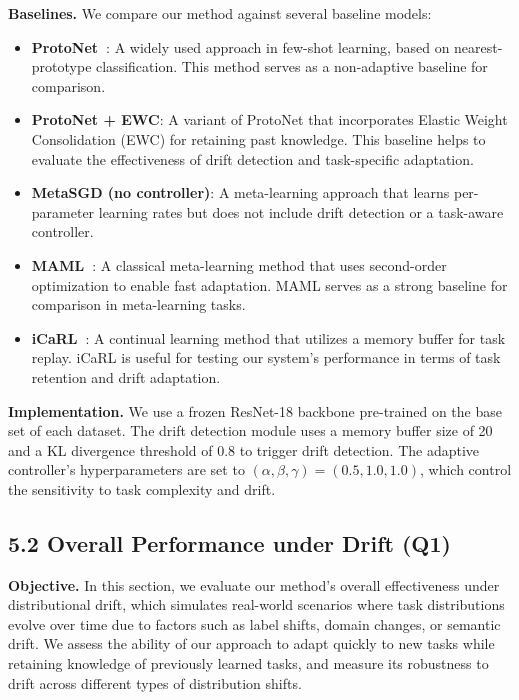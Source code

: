 \documentclass[conference]{IEEEtran}
\begin{document}
\textbf{Baselines.}  
We compare our method against several baseline models:
\begin{itemize}
    \item \textbf{ProtoNet~\cite{snell2017prototypical}}: A widely used approach in few-shot learning, based on nearest-prototype classification. This method serves as a non-adaptive baseline for comparison.
    \item \textbf{ProtoNet + EWC}: A variant of ProtoNet that incorporates Elastic Weight Consolidation (EWC) for retaining past knowledge. This baseline helps to evaluate the effectiveness of drift detection and task-specific adaptation.
    \item \textbf{MetaSGD (no controller)}: A meta-learning approach that learns per-parameter learning rates but does not include drift detection or a task-aware controller.
    \item \textbf{MAML~\cite{finn2017maml}}: A classical meta-learning method that uses second-order optimization to enable fast adaptation. MAML serves as a strong baseline for comparison in meta-learning tasks.
    \item \textbf{iCaRL~\cite{rebuffi2017icarl}}: A continual learning method that utilizes a memory buffer for task replay. iCaRL is useful for testing our system's performance in terms of task retention and drift adaptation.
\end{itemize}

\textbf{Implementation.}  
We use a frozen ResNet-18 backbone pre-trained on the base set of each dataset. The drift detection module uses a memory buffer size of 20 and a KL divergence threshold of 0.8 to trigger drift detection. The adaptive controller's hyperparameters are set to $(\alpha, \beta, \gamma) = (0.5, 1.0, 1.0)$, which control the sensitivity to task complexity and drift.

\vspace{0.5em}


\subsection{5.2 Overall Performance under Drift (Q1)}

\textbf{Objective.}  
In this section, we evaluate our method’s overall effectiveness under distributional drift, which simulates real-world scenarios where task distributions evolve over time due to factors such as label shifts, domain changes, or semantic drift. We assess the ability of our approach to adapt quickly to new tasks while retaining knowledge of previously learned tasks, and measure its robustness to drift across different types of distribution shifts.
\end{document}
